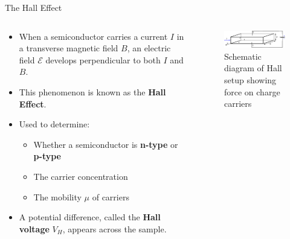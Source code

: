 \begin{frame}{The Hall Effect}
\begin{columns}
    \begin{column}{0.5\textwidth}
    \begin{itemize}
        \item When a semiconductor carries a current $I$ in a transverse magnetic field $B$, an electric field $\mathcal{E}$ develops perpendicular to both $I$ and $B$.
        \item This phenomenon is known as the \textbf{Hall Effect}.
        \item Used to determine:
        \begin{itemize}
            \item Whether a semiconductor is \textbf{n-type} or \textbf{p-type}
            \item The carrier concentration
            \item The mobility $\mu$ of carriers
        \end{itemize}
        \item A potential difference, called the \textbf{Hall voltage} $V_H$, appears across the sample.
    \end{itemize}
\end{column}
\begin{column}{0.5\textwidth}
    \begin{figure}[h]
        \centering
        \includegraphics[width=1\textwidth]{fig/lec02/hall_effect.pdf} %
        \caption{Schematic diagram of Hall setup showing force on charge carriers}
    \end{figure}
\end{column}
\end{columns}
\end{frame}

